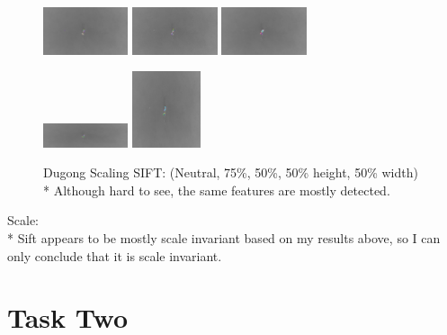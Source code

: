 \documentclass[conference]{IEEEtran}
\begin{document}
\begin{figure}[H]
    \centerline{
        {\includegraphics[width=25mm, scale=0.5]{./figures/SIFT/DugongNeutral SIFT.png}}
        {\includegraphics[width=25mm, scale=0.5]{./figures/SIFT/Dugong75 SIFT.png}}
        {\includegraphics[width=25mm, scale=0.5]{./figures/SIFT/Dugong50 SIFT.png}}
    }
    \centerline{
        {\includegraphics[width=25mm, scale=0.5]{./figures/SIFT/DugongheightReduced SIFT.png}}
        {\includegraphics[width=20mm, scale=0.5]{./figures/SIFT/DugongwidthReduced SIFT.png}}
    }
    \caption{Dugong Scaling SIFT: (Neutral, 75\%, 50\%, 50\% height, 50\% width)\\*
    Although hard to see, the same features are mostly detected.}
    \label{fig}
\end{figure}
Scale: \\*
Sift appears to be mostly scale invariant based on my results above, so I can only conclude that it is scale invariant.

\section{Task Two}
\end{document}
